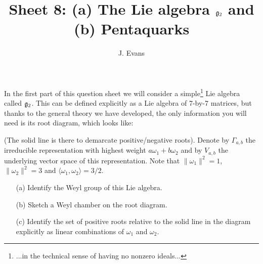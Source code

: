 \documentclass[12pt]{article}
\title{Sheet 8: (a) The Lie algebra $\mathfrak{g}_2$ and (b) Pentaquarks}
\author{J. Evans}
\date{}
\begin{document}
\maketitle

In the first part of this question sheet we will consider a simple\footnote{...in the technical sense of having no nonzero ideals...} Lie algebra called $\mathfrak{g}_2$. This can be defined explicitly as a Lie algebra of 7-by-7 matrices, but thanks to the general theory we have developed, the only information you will need is its root diagram, which looks like:

\gtwoadj

(The solid line is there to demarcate positive/negative roots). Denote by $\Gamma_{a,b}$ the irreducible representation with highest weight $a\omega_1+b\omega_2$ and by $V_{a,b}$ the underlying vector space of this representation. Note that $\|\omega_1\|^2=1$, $\|\omega_2\|^2=3$ and $\langle\omega_1,\omega_2\rangle=3/2$.

\bigskip

\begin{question}
\begin{enumerate}
\item[(a)] Identify the Weyl group of this Lie algebra.
\item[(b)] Sketch a Weyl chamber on the root diagram.
\item[(c)] Identify the set of positive roots relative to the solid line in the diagram explicitly as linear combinations of $\omega_1$ and $\omega_2$.
\end{enumerate}
\end{question}

\iffalse
\begin{answer}
\begin{enumerate}[(a)]
\item The Weyl group is the dihedral group of order 12 (symmetries of a hexagon) since it is generated by the reflections in root vectors. To see this note that the shorter roots form the vertices of a hexagon. The longer roots bisect the edges and give three of the reflections, the reflections in shorter roots give three more reflections. Those six reflections generate the Weyl group and they are also known to generate the symmetry group of the hexagon.
\item A Weyl chamber is given, for example, by the segment of plane bounded by the rays through $\omega_1$ and $\omega_2$.
\item The positive roots are 

\gtwoadjpos

\end{enumerate}
\end{answer}
\newpage
\fi
\end{document}
